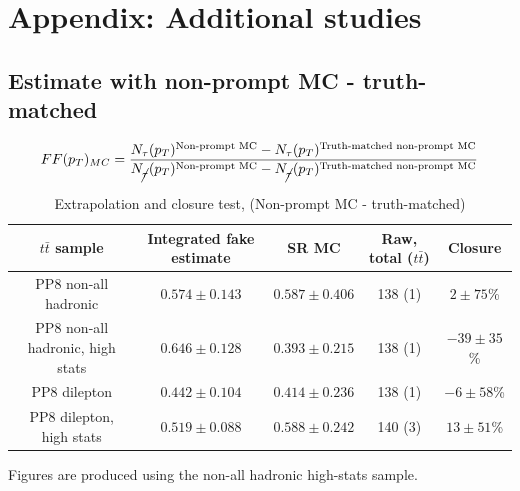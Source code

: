 \documentclass[11pt]{article}
\begin{document}
	
	\clearpage
	\appendix
	\section{Appendix: Additional studies} 
	\subsection{Estimate with non-prompt MC - truth-matched} 
	\begin{equation}
		FF(p_T)_{MC} = \frac{N_\tau (p_T)^{\text{Non-prompt MC}} - N_\tau (p_T)^{\text{Truth-matched non-prompt MC}}}{N_{\cancel{\tau}} (p_T)^{\text{Non-prompt MC}} - N_{\cancel{\tau}} (p_T)^{\text{Truth-matched non-prompt MC}}}
	\end{equation}

	\begin{table}[htp]
	\caption{Extrapolation and closure test, (Non-prompt MC - truth-matched)}
	\begin{center}
	\begin{tabular}{|c|c|c|c|c|}
	\hline
	$t\bar{t}$ sample 	& Integrated fake estimate	& SR MC		&  	Raw, total ($t\bar{t}$) 	& Closure \\
	\hline
	PP8 non-all hadronic			& 	$0.574\pm0.143$ 		& $0.587\pm0.406$ 		& 138 (1)	&  $2\pm75$\% \\
	PP8 non-all hadronic, high stats	& 	$0.646\pm0.128$ 		& $0.393\pm0.215$ 		& 138 (1)	&  $-39\pm35$\% \\
	PP8 dilepton 					& 	$0.442\pm0.104$ 		& $0.414\pm0.236$ 		& 138 (1)	&  $-6\pm58$\% \\
	PP8 dilepton, high stats			& 	$0.519\pm0.088$ 		& $0.588\pm0.242$ 		& 140 (3)	&  $13\pm51$\% \\
	\hline
	\end{tabular}
	\end{center}
	\label{default}
	\end{table}%

	Figures are produced using the non-all hadronic high-stats sample. 
\end{document}
